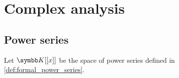 \section{Complex analysis}\label{subsec:complex_analysis}
\subsection{Power series}\label{subsec:power_series}

\begin{definition}\label{def:convergent_power_series}
  Let \( \K[[x]] \) be the space of power series defined in \cref{def:formal_power_series}.
\end{definition}
